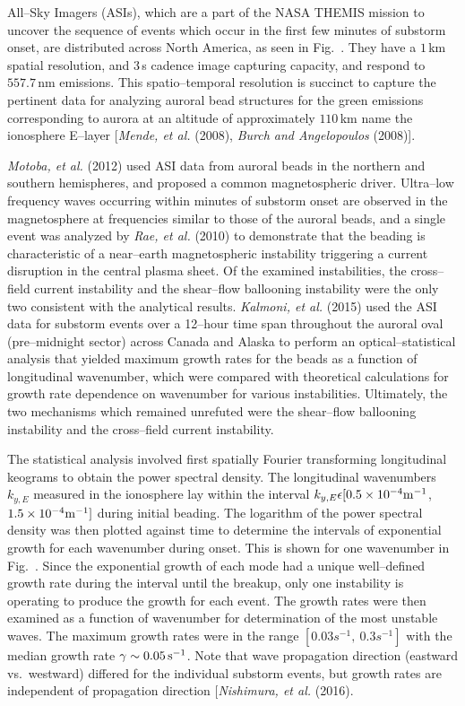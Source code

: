 \documentclass[a4paper,openany,12pt]{book}
\begin{document}
All--Sky Imagers (ASIs), which are a part of the NASA THEMIS mission to uncover the sequence of events which occur in the first few minutes of substorm onset, are distributed across North America, as seen in Fig.~\quad. They have a $1\,$km spatial resolution, and $3\,$s cadence image capturing capacity, and respond to $557.7\,$nm emissions. This spatio--temporal resolution is succinct to capture the pertinent data for analyzing auroral bead structures for the green emissions corresponding to aurora at an altitude of approximately $110\,$km name the ionosphere E--layer [\emph{Mende, et al.} (2008), \emph{Burch and Angelopoulos} (2008)].

\emph{Motoba, et al.} (2012) used ASI data from auroral beads in the northern and southern hemispheres, and proposed a common magnetospheric driver. Ultra--low frequency waves occurring within minutes of substorm onset are observed in the magnetosphere at frequencies similar to those of the auroral beads, and a single event was analyzed by \emph{Rae, et al.} (2010) to demonstrate that the beading is characteristic of a near--earth magnetospheric instability triggering a current disruption in the central plasma sheet. Of the examined instabilities, the cross--field current instability and the shear--flow ballooning instability were the only two consistent with the analytical results. \emph{Kalmoni, et al.} (2015) used the ASI data for substorm events over a 12--hour time span throughout the auroral oval (pre--midnight sector) across Canada and Alaska to perform an optical--statistical analysis that yielded maximum growth rates for the beads as a function of longitudinal wavenumber, which were compared with theoretical calculations for growth rate dependence on wavenumber for various instabilities. Ultimately, the two mechanisms which remained unrefuted were the shear--flow ballooning instability and the cross--field current instability.

The statistical analysis involved first spatially Fourier transforming longitudinal keograms to obtain the power spectral density. The longitudinal wavenumbers 
$k_{y,E}$ measured in the ionosphere lay within the interval 
$k_{y,E}\epsilon[0.5\times 10^{-4}{\rm m}^{-1}$,\ $1.5\times 10^{-4}\rm m^{-1}]$ during initial beading. The logarithm of the power spectral density was then plotted against time to determine the intervals of exponential growth for each wavenumber during onset. This is shown for one wavenumber in Fig.~\quad. Since the exponential growth of each mode had a unique well--defined growth rate during the interval until the breakup, only one instability is operating to produce the growth for each event. The growth rates were then examined as a function of wavenumber for determination of the most unstable waves. The maximum growth rates were in the range $[0.03s^{-1},\ 0.3s^{-1}]$ with the median growth rate $\gamma\sim 0.05\,\rm s^{-1}$.
%
Note that wave propagation direction (eastward vs.~westward) differed for the individual substorm events, but growth rates are independent of propagation direction [\emph{Nishimura, et al.} (2016).
\end{document}
